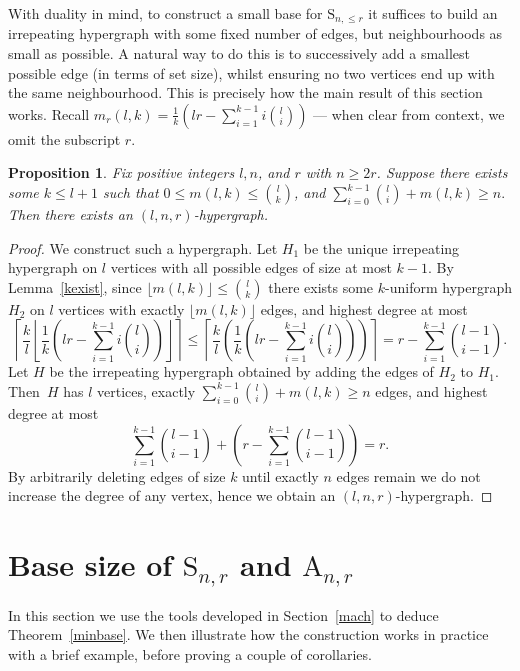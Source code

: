 \documentclass[10pt,a4paper]{amsart}
\providecommand{\texorpdfstring}[2]{#1}
\renewcommand\S{\mathrm{S}}
\theoremstyle{plain}
\newtheorem{prop}[cdrthm]{Proposition}
\theoremstyle{definition}
\theoremstyle{remark}
\begin{document}
With duality in mind, to construct a small base for $\S_{n,\leq r}$ it suffices to build an irrepeating hypergraph with some fixed number of edges, but neighbourhoods as small as possible. A natural way to do this is to successively add a smallest possible edge (in terms of set size), whilst ensuring no two vertices end up with the same neighbourhood. This is precisely how the main result of this section works. Recall $m_r(l,k)=\frac{1}{k}\left(lr-\sum_{i=1}^{k-1}i\binom{l}{i}\right)$ --- when clear from context, we omit the subscript $r$.

\begin{prop}\label{hypexist}
Fix positive integers $l,n$, and $r$ with $n\geq 2r$. Suppose there exists some $k\leq l+1$ such that $0\leq m(l,k)\leq\binom{l}{k}$, and $\sum_{i=0}^{k-1}\binom{l}{i}+m(l,k)\geq n.$
Then there exists an $(l,n,r)$-hypergraph.
\end{prop}

\begin{proof}
We construct such a hypergraph. Let $H_1$ be the unique irrepeating hypergraph on $l$ vertices with all possible edges of size at most $k-1$. 
By Lemma~\ref{kexist}, since $\lfloor m(l,k)\rfloor\leq \binom{l}{k}$ there exists some $k$-uniform hypergraph $H_2$ on $l$ vertices with exactly $\lfloor m(l,k)\rfloor$ edges, and highest degree at most $$\left\lceil \frac{k}{l}\left\lfloor \frac{1}{k}\left(lr-\sum_{i=1}^{k-1}i\binom{l}{i}\right)\right\rfloor\right\rceil \leq \left\lceil \frac{k}{l}\left( \frac{1}{k}\left(lr-\sum_{i=1}^{k-1}i\binom{l}{i}\right)\right)\right\rceil = r-\sum_{i=1}^{k-1}\binom{l-1}{i-1}.$$ Let $H$ be the irrepeating hypergraph obtained by adding the edges of $H_2$ to $H_1$. Then~$H$ has $l$ vertices, exactly $\sum_{i=0}^{k-1}\binom{l}{i}+m(l,k)\geq n$ edges, and highest degree at most $$\sum_{i=1}^{k-1}\binom{l-1}{i-1} +\left(r-\sum_{i=1}^{k-1}\binom{l-1}{i-1}\right)=r.$$ 
By arbitrarily deleting edges of size $k$ until exactly $n$ edges remain we do not increase the degree of any vertex, hence we obtain an $(l,n,r)$-hypergraph.
\end{proof}

\section{Base size of \texorpdfstring{$\S_{n,r}$}{Snr} and \texorpdfstring{$\mathrm{A}_{n,r}$}{Anr}}\label{minb}

In this section we use the tools developed in Section~\ref{mach} to deduce Theorem~\ref{minbase}. We then illustrate how the construction works in practice with a brief example, before proving a couple of corollaries. 
\end{document}
